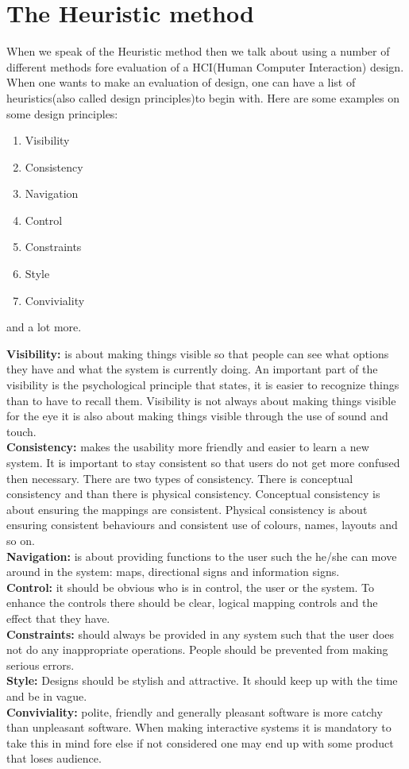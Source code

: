 \section{The Heuristic method}
When we speak of the Heuristic method then we talk about using a number of different methods fore evaluation of a HCI(Human Computer Interaction) design. When one wants to make an evaluation of design, one can have a list of heuristics(also called design principles)to begin with. Here are some examples on some design principles:
\begin{enumerate}
\item Visibility
\item Consistency
\item Navigation
\item Control
\item Constraints
\item Style
\item Conviviality
\end{enumerate}
and a lot more.

\textbf{Visibility:} is about making things visible so that people can see what options they have and what the system is currently doing. An important part of the visibility is the psychological principle that states, it is easier to recognize things than to have to recall them. Visibility is not always about making things visible for the eye it is also about making things visible through the use of sound and touch.\\
\textbf{Consistency:} makes the usability more friendly and easier to learn a new system. It is important to stay consistent so that users do not get more confused then necessary. There are two types of consistency. There is conceptual consistency and than there is physical consistency. Conceptual consistency is about ensuring the mappings are consistent. Physical consistency is about ensuring consistent behaviours and consistent use of colours, names, layouts and so on.\\
\textbf{Navigation:} is about providing functions to the user such the he/she can move around in the system: maps, directional signs and information signs.\\ 
\textbf{Control:} it should be obvious who is in control, the user or the system. To enhance the controls there should be clear, logical mapping controls and the effect that they have.\\
\textbf{Constraints:} should always be provided in any system such that the user does not do any inappropriate operations. People should be prevented from making serious errors.\\ 
\textbf{Style:} Designs should be stylish and attractive. It should keep up with the time and be in vague.\\ 
\textbf{Conviviality:} polite, friendly and generally pleasant software is more catchy than unpleasant software. When making interactive systems it is mandatory to take this in mind fore else if not considered one may end up with some product that loses audience.\\

